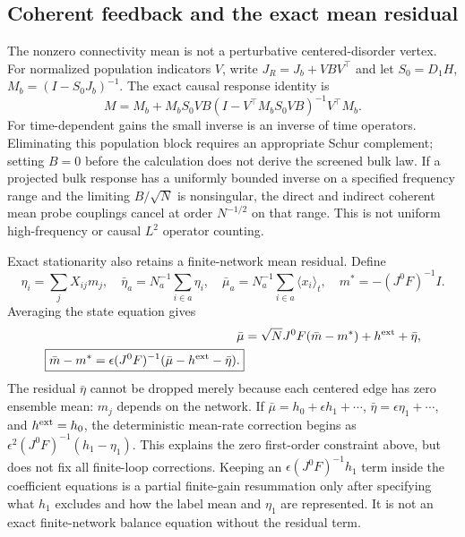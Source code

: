 \subsection{Coherent feedback and the exact mean residual}
The nonzero connectivity mean is not a perturbative centered-disorder vertex.
For normalized population indicators $V$, write $J_R=J_b+VBV^\top$ and
let $S_0=D_1H$, $M_b=(I-S_0J_b)^{-1}$. The exact causal response identity is
\[
 M=M_b+M_bS_0VB(I-V^\top M_bS_0VB)^{-1}V^\top M_b.
\]
For time-dependent gains the small inverse is an inverse of time operators.
Eliminating this population block requires an appropriate Schur complement;
setting $B=0$ before the calculation does not derive the screened bulk law.
If a projected bulk response has a uniformly bounded inverse on a specified
frequency range and the limiting $B/\sqrt N$ is nonsingular, the direct and
indirect coherent mean probe couplings cancel at order $N^{-1/2}$ on that
range. This is not uniform high-frequency or causal $L^2$ operator counting.

Exact stationarity also retains a finite-network mean residual. Define
\[
 \eta_i=\sum_jX_{ij}m_j,\quad
 \bar\eta_a=N_a^{-1}\sum_{i\in a}\eta_i,\quad
 \bar\mu_a=N_a^{-1}\sum_{i\in a}\langle x_i\rangle_t,
 \quad m^*=-(J^0F)^{-1}I.
\]
Averaging the state equation gives
\begin{align*}
 \bar\mu&=\sqrt N J^0F(\bar m-m^*)+h^{\rm ext}+\bar\eta,\\
 \boxed{\bar m-m^*=\epsilon(J^0F)^{-1}
             (\bar\mu-h^{\rm ext}-\bar\eta).}
\end{align*}
The residual $\bar\eta$ cannot be dropped merely because each centered edge
has zero ensemble mean: $m_j$ depends on the network. If
$\bar\mu=h_0+\epsilon h_1+\cdots$,
$\bar\eta=\epsilon\eta_1+\cdots$, and $h^{\rm ext}=h_0$, the deterministic
mean-rate correction begins as
$\epsilon^2(J^0F)^{-1}(h_1-\eta_1)$. This explains the zero first-order
constraint above, but does not fix all finite-loop corrections.
Keeping an $\epsilon(J^0F)^{-1}h_1$ term inside the coefficient equations is
a partial finite-gain resummation only after specifying what $h_1$ excludes
and how the label mean and $\eta_1$ are represented. It is not an exact
finite-network balance equation without the residual term.

